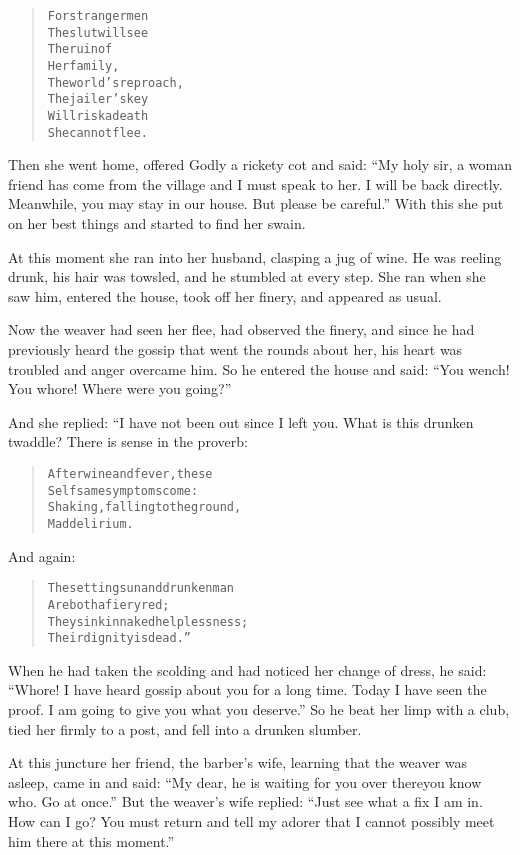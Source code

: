 \documentclass[article, twoside, 14pt]{memoir}
\renewenvironment{verbatim}{%
\begin{quote}%
\vskip -10pt%
\begin{alltt}\normalfont\large}{\end{alltt}%
\end{quote}%
\vskip -10pt
} %
\begin{document}
\begin{verbatim}
For stranger men
    The slut will see
The ruin of
    Her family,
The world's reproach,
    The jailer's key{\textemdash}
Will risk a death
    She cannot flee.
\end{verbatim}
Then she went home, offered Godly a rickety cot and said:
``My holy sir, a woman friend has come from the village and I must speak to her. I will be back directly. Meanwhile, you may stay in our house. But please be careful.''
With this she put on her best things and started to find her
swain.

At this moment she ran into her husband, clasping a jug of wine. He
was reeling drunk, his hair was towsled, and he stumbled at every
step. She ran when she saw him, entered the house, took off her
finery, and appeared as usual.

Now the weaver had seen her flee, had observed the finery, and
since he had previously heard the gossip that went the rounds
about her, his heart was troubled and anger overcame him. So he
entered the house and said:
``You wench! You whore! Where were you going?''

And she replied: “I have not been out since I left you. What is
this drunken twaddle? There is sense in the proverb:

\begin{verbatim}
After wine and fever, these
    Selfsame symptoms come:
Shaking, falling to the ground,
    Mad delirium.
\end{verbatim}
And again:

\begin{verbatim}
The setting sun and drunken man
    Are both a fiery red;
They sink in naked helplessness;
    Their dignity is dead.”
\end{verbatim}
When he had taken the scolding and had noticed her change of dress,
he said:
``Whore! I have heard gossip about you for a long time. Today I have seen the proof. I am going to give you what you deserve.''
So he beat her limp with a club, tied her firmly to a post, and
fell into a drunken slumber.

At this juncture her friend, the barber's wife, learning that the
weaver was asleep, came in and said:
``My dear, he is waiting for you over there{\textemdash}you know who. Go at once.''
But the weaver's wife replied:
``Just see what a fix I am in. How can I go? You must return and tell my adorer that I cannot possibly meet him there at this moment.''
\end{document}
